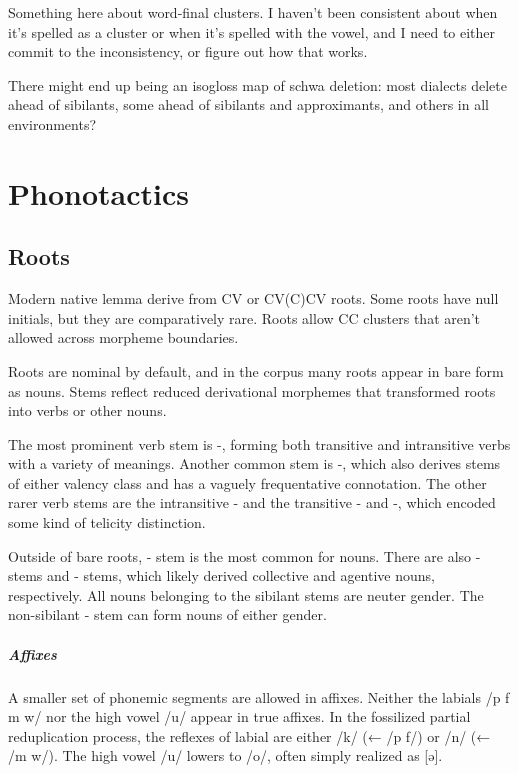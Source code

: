 \begin{kaobox}[frametitle=\sc todo:] 
Something here about word-final clusters. I haven't been consistent about when it's spelled as a cluster or when it's spelled with the vowel, and I need to either commit to the inconsistency, or figure out how that works.
\end{kaobox}

\begin{kaobox}[frametitle=\sc todo:] 
There might end up being an isogloss map of schwa deletion: most dialects delete ahead of sibilants, some ahead of sibilants and approximants, and others in all environments?
\end{kaobox}

\setchapterpreamble[u]{\margintoc}
\chapter{Phonotactics}
\section{Roots}
Modern native lemma derive from CV or CV(C)CV roots. Some roots have null initials, but they are comparatively rare. Roots allow CC clusters that aren't allowed across morpheme boundaries.

Roots are nominal by default, and in the corpus many roots appear in bare form as nouns. Stems reflect reduced derivational morphemes that transformed roots into verbs or other nouns.

The most prominent verb stem is -, forming both transitive and intransitive verbs with a variety of meanings. Another common stem is -, which also derives stems of either valency class and has a vaguely frequentative connotation. The other rarer verb stems are the intransitive - and the transitive - and -, which encoded some kind of telicity distinction.

Outside of bare roots, - stem is the most common for nouns. There are also - stems and - stems, which likely derived collective and agentive nouns, respectively. All nouns belonging to the sibilant stems are neuter gender. The non-sibilant - stem can form nouns of either gender.

\paragraph{Affixes}
A smaller set of phonemic segments are allowed in affixes. Neither the labials /p f m w/ nor the high vowel /u/ appear in true affixes. In the fossilized partial reduplication process, the reflexes of labial are either /k/ (← /p f/) or /n/ (← /m w/). The high vowel /u/ lowers to /o/, often simply realized as [ə].

